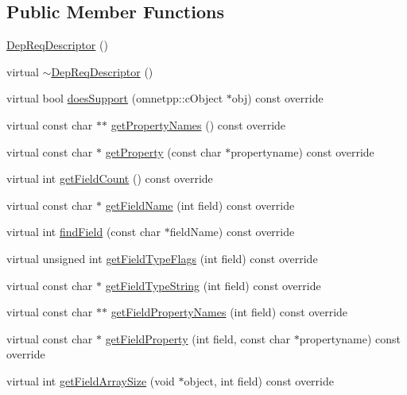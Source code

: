 \subsection*{Public Member Functions}
\begin{DoxyCompactItemize}
\item 
\hyperlink{class_dep_req_descriptor_acc9a0e0eef48f3a21fc8ac17d63bf10a}{Dep\+Req\+Descriptor} ()
\item 
virtual \hyperlink{class_dep_req_descriptor_a68e3426897aa8baff48b1acae276c967}{$\sim$\+Dep\+Req\+Descriptor} ()
\item 
virtual bool \hyperlink{class_dep_req_descriptor_a1d6a05ff831c136608bac01b04cb8779}{does\+Support} (omnetpp\+::c\+Object $\ast$obj) const override
\item 
virtual const char $\ast$$\ast$ \hyperlink{class_dep_req_descriptor_a1b9e8ad7d683c9e2d1396e48fd7ec24f}{get\+Property\+Names} () const override
\item 
virtual const char $\ast$ \hyperlink{class_dep_req_descriptor_ae00fcc364ffe7494eaa0516f04c1e3f8}{get\+Property} (const char $\ast$propertyname) const override
\item 
virtual int \hyperlink{class_dep_req_descriptor_a7ca06e0d74b9a2eb7c335a935a52938f}{get\+Field\+Count} () const override
\item 
virtual const char $\ast$ \hyperlink{class_dep_req_descriptor_a8ef6ae7af9cb96791e005fd5e0c1e255}{get\+Field\+Name} (int field) const override
\item 
virtual int \hyperlink{class_dep_req_descriptor_a9c2af40c798a0d7bbb671f175734836c}{find\+Field} (const char $\ast$field\+Name) const override
\item 
virtual unsigned int \hyperlink{class_dep_req_descriptor_a67f19e0852007122a7ed1a3f773069ac}{get\+Field\+Type\+Flags} (int field) const override
\item 
virtual const char $\ast$ \hyperlink{class_dep_req_descriptor_abccd49184b08f6cbf98825c5cef37252}{get\+Field\+Type\+String} (int field) const override
\item 
virtual const char $\ast$$\ast$ \hyperlink{class_dep_req_descriptor_aedf5f2e33ed13cfb2d4584664dba743f}{get\+Field\+Property\+Names} (int field) const override
\item 
virtual const char $\ast$ \hyperlink{class_dep_req_descriptor_a86446083bf6eecb500c464288794e4a0}{get\+Field\+Property} (int field, const char $\ast$propertyname) const override
\item 
virtual int \hyperlink{class_dep_req_descriptor_a68402dadf251334b924fd9505c388bad}{get\+Field\+Array\+Size} (void $\ast$object, int field) const override

\end{DoxyCompactItemize}

